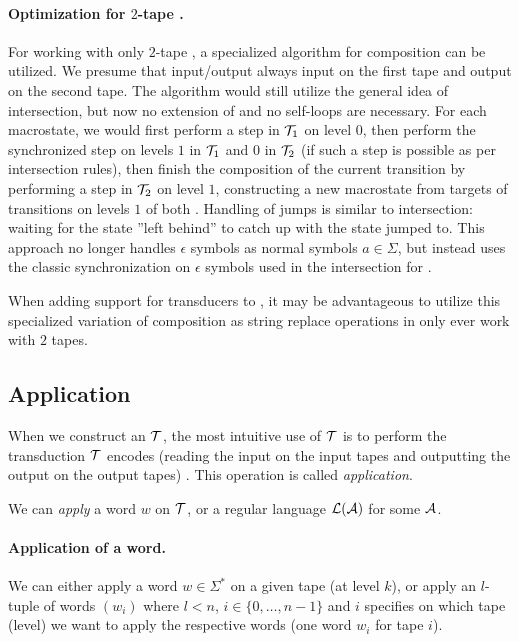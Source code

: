 \paragraph{Optimization for $2$-tape \nfts.}
For working with only $2$-tape \nfts, a specialized algorithm for composition can be utilized.
We presume that input/output \nfts always input on the first tape and output on the second tape.
The algorithm would still utilize the general idea of \nft intersection, but now no extension of \nfts and no self-loops are necessary.
For each macrostate, we would first perform a step in $\mathcal{T}_1$ on level $0$, then perform the synchronized step on levels $1$ in $\mathcal{T}_1$ and $0$ in $\mathcal{T}_2$ (if such a step is possible as per \nft intersection rules), then finish the composition of the current transition by performing a step in $\mathcal{T}_2$ on level $1$, constructing a new macrostate from targets of transitions on levels $1$ of both \nfts.
Handling of jumps is similar to \nft intersection: waiting for the state ''left behind'' to catch up with the state jumped to.
This approach no longer handles $\epsilon$ symbols as normal symbols $a \in \Sigma$, but instead uses the classic synchronization on $\epsilon$ symbols used in the intersection for \nfas.

When adding support for transducers to \noodler, it may be advantageous to utilize this specialized variation of composition as string replace operations in \noodler only ever work with $2$ tapes.

\subsection{Application}

When we construct an \nft $\mathcal{T}$, the most intuitive use of $\mathcal{T}$ is to perform the transduction $\mathcal{T}$ encodes (reading the input on the input tapes and outputting the output on the output tapes) .
This operation is called \emph{application}.

We can \emph{apply} a word $w$ on $\mathcal{T}$, or a regular language $\mathcal{L}(\mathcal{A})$ for some $\mathcal{A}$.

\paragraph{Application of a word.}
We can either apply a word $w \in \Sigma^*$ on a given tape (at level $k$), or apply an $l$-tuple of words $(w_i)$ where $l < n$, $i \in \{ 0, \ldots, n - 1 \}$ and $i$ specifies on which tape (level) we want to apply the respective words (one word $w_i$ for tape $i$).

